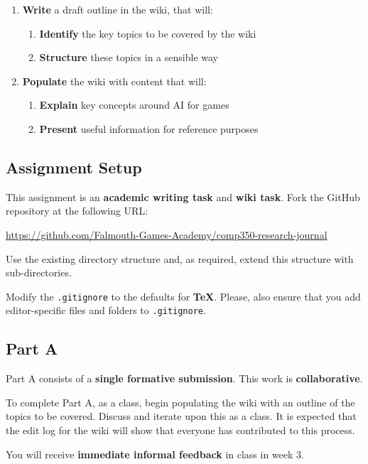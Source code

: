 \documentclass{../../fal_assignment}
\begin{document}
	\begin{enumerate}[label=(\Alph*)]
		\item \textbf{Write} a draft outline in the wiki, that will:
		\begin{enumerate}[label=(\roman*)]
			\item \textbf{Identify} the key topics to be covered by the wiki
			\item \textbf{Structure} these topics in a sensible way
		\end{enumerate}
		\item \textbf{Populate} the wiki with content that will:
		\begin{enumerate}[label=(\roman*)]
			\item \textbf{Explain} key concepts around AI for games
			\item \textbf{Present} useful information for reference purposes
		\end{enumerate}
	\end{enumerate}

\subsection*{Assignment Setup}

This assignment is an \textbf{academic writing task} and \textbf{wiki task}. Fork the GitHub repository at the following URL:

\indent \url{https://github.com/Falmouth-Games-Academy/comp350-research-journal}

Use the existing directory structure and, as required, extend this structure with sub-directories.

Modify the \texttt{.gitignore} to the defaults for \textbf{TeX}. Please, also ensure that you add editor-specific files and folders to \texttt{.gitignore}. 

\subsection*{Part A}

Part A consists of a \textbf{single formative submission}. This work is \textbf{collaborative}.

To complete Part A, as a class, begin populating the wiki with an outline of the topics to be covered.
Discuss and iterate upon this as a class.
It is expected that the edit log for the wiki will show that everyone has contributed to this process.

You will receive \textbf{immediate informal feedback} in class in week 3.
\end{document}
